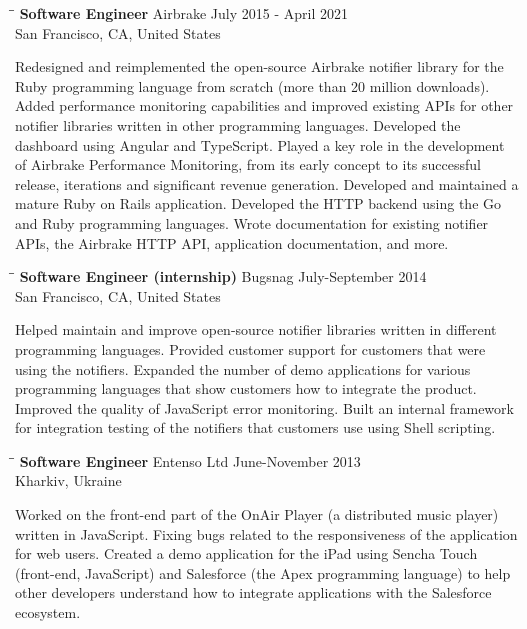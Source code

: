 \documentclass{res}
\begin{document}
\begin{resume}
  \begin{tabbing}
    \hspace{2.3in}\= \hspace{2.6in}\= \kill
    {\bf Software Engineer}  \>Airbrake \> \hspace{-0.3in} July 2015 - April 2021\\
    \>San Francisco, CA, United States
  \end{tabbing}\vspace{-20pt}
  Redesigned and reimplemented the open-source Airbrake notifier library for the
  Ruby programming language from scratch (more than 20 million downloads). Added
  performance monitoring capabilities and improved existing APIs for other
  notifier libraries written in other programming languages. Developed the
  dashboard using Angular and TypeScript. Played a key role in the development
  of Airbrake Performance Monitoring, from its early concept to its successful
  release, iterations and significant revenue generation. Developed and
  maintained a mature Ruby on Rails application. Developed the HTTP backend
  using the Go and Ruby programming languages. Wrote documentation for existing
  notifier APIs, the Airbrake HTTP API, application documentation, and more.

  \begin{tabbing}
    \hspace{2.3in}\= \hspace{2.6in}\= \kill
    {\bf Software Engineer (internship)}  \>Bugsnag \> \hspace{-0.2in} July-September  2014\\
    \>San Francisco, CA, United States
  \end{tabbing}\vspace{-20pt}
  Helped maintain and improve open-source notifier libraries written in
  different programming languages. Provided customer support for customers that
  were using the notifiers. Expanded the number of demo applications for various
  programming languages that show customers how to integrate the product.
  Improved the quality of JavaScript error monitoring. Built an internal
  framework for integration testing of the notifiers that customers use using
  Shell scripting.

  \begin{tabbing}
    \hspace{2.3in}\= \hspace{2.6in}\= \kill
    {\bf Software Engineer}  \>Entenso Ltd \> \hspace{-0.2in} June-November 2013\\
    \>Kharkiv, Ukraine
  \end{tabbing}\vspace{-20pt}
  Worked on the front-end part of the OnAir Player (a distributed music player)
  written in JavaScript. Fixing bugs related to the responsiveness of the
  application for web users. Created a demo application for the iPad using
  Sencha Touch (front-end, JavaScript) and Salesforce (the Apex programming
  language) to help other developers understand how to integrate applications
  with the Salesforce ecosystem.


\end{resume}
\end{document}
